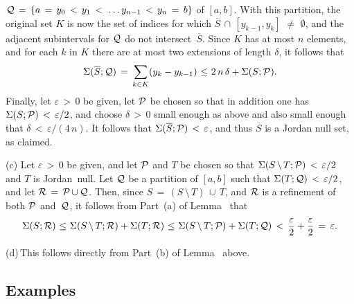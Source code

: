     ${\cal Q} \,=\, \{a \,=\, y_{0}\,<\,y_{1}\,<\,\,{\ldots}\,y_{n-1}\,<\,y_{n} \,=\, b\}$ of $[a,b]$.
    With this partition, the original set $K$ is now the set of indices for which $\overline{S}\,{\cap}\,[y_{k-1},y_{k}] \,\,{\neq}\,\, {\emptyset}$,
    and the adjacent subintervals for ${\cal Q}$ do not intersect~$\overline{S}$. Since $K$ has at most $n$ elements,
    and for each $k$ in $K$ there are at most two extensions of length ${\delta}$, it follows that
        \begin{displaymath}
        {\Sigma}(\overline{S};{\cal Q}) \,=\, \sum_{k{\in}K} (y_{k}-y_{k-1})
    \,\,{\leq}\,\,
        2\,n\,{\delta} + {\Sigma}(S;{\cal P}).
        \end{displaymath}
    Finally, let ${\varepsilon}\,>\,0$ be given, let ${\cal P}$ be chosen so that in addition one has ${\Sigma}(S;{\cal P})\,<\,{\varepsilon}/2$,
    and choose ${\delta}\,>\,0$ small enough as above and also small enough that ${\delta}\,<\,{\varepsilon}/(4\,n)$.
    It follows that ${\Sigma}(\overline{S};{\cal P})\,<\,{\varepsilon}$, and thus $\overline{S}$ is a Jordan null set, as claimed.

\V


        (c) Let ${\varepsilon}\,>\,0$ be given, and let ${\cal P}$ and $T$ be chosen so that ${\Sigma}(S\,{\setminus}\,T;{\cal P})\,<\,{\varepsilon}/2$ and $T$ is Jordan~null.
    Let ${\cal Q}$ be a partition of $[a,b]$ such that ${\Sigma}(T;{\cal Q})\,<\,{\varepsilon}/2$, and let ${\cal R} \,=\, {\cal P}\,{\cup}\,{\cal Q}$.
    Then, since $S \,=\, (S\,{\setminus}\,T)\,{\cup}\,T$, and ${\cal R}$ is a refinement of both ${\cal P}$ and~${\cal Q}$, it follows from Part~(a) of Lemma~ that
        \begin{displaymath}
        {\Sigma}(S;{\cal R})\,\,{\leq}\,\,{\Sigma}(S\,{\setminus}\,T;{\cal R}) + {\Sigma}(T;{\cal R})
    \,\,{\leq}\,\,
        {\Sigma}(S\,{\setminus}\,T;{\cal P}) + {\Sigma}(T;{\cal Q})\,<\,\frac{{\varepsilon}}{2} + \frac{{\varepsilon}}{2} \,=\, {\varepsilon}.
        \end{displaymath}

\V

        (d)\,This follows directly from Part~(b) of Lemma~ above.

\V

        \subsection{\small{{\bf Examples}}}
        \label{ExampH20.55C}

